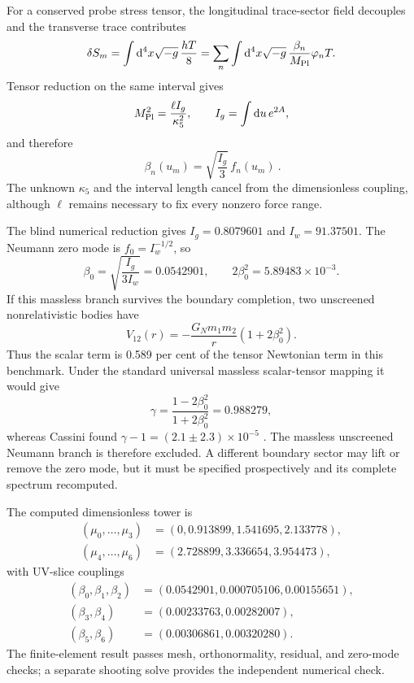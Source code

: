 \documentclass[10pt]{article}
\newcommand{\dd}{\mathrm{d}}
\begin{document}
For a conserved probe stress tensor, the longitudinal trace-sector field
decouples and the transverse trace contributes
\begin{equation}
 \delta S_m=\int\dd^4x\sqrt{-g}\,\frac{hT}{8}
 =\sum_n\int\dd^4x\sqrt{-g}\,
 \frac{\beta_n}{M_{\rm Pl}}\varphi_nT .
\end{equation}
Tensor reduction on the same interval gives
\begin{equation}
 M_{\rm Pl}^2=\frac{\ell I_g}{\kappa_5^2},\qquad
 I_g=\int\dd u\,e^{2A},
\end{equation}
and therefore
\begin{equation}
 \boxed{\ \beta_n(u_m)=\sqrt{\frac{I_g}{3}}\,f_n(u_m)\ }.
 \label{eq:betaderived}
\end{equation}
The unknown $\kappa_5$ and the interval length cancel from the dimensionless
coupling, although $\ell$ remains necessary to fix every nonzero force range.

The blind numerical reduction gives $I_g=0.8079601$ and $I_w=91.37501$.
The Neumann zero mode is $f_0=I_w^{-1/2}$, so
\begin{equation}
 \beta_0=\sqrt{\frac{I_g}{3I_w}}=0.0542901,
 \qquad 2\beta_0^2=5.89483\times10^{-3}.
 \label{eq:zeroforce}
\end{equation}
If this massless branch survives the boundary completion, two unscreened
nonrelativistic bodies have
\begin{equation}
 V_{12}(r)=-\frac{G_Nm_1m_2}{r}\left(1+2\beta_0^2\right).
\end{equation}
Thus the scalar term is 0.589 per cent of the tensor Newtonian term in this
benchmark.  Under the standard universal massless scalar-tensor mapping it
would give
\begin{equation}
 \gamma=\frac{1-2\beta_0^2}{1+2\beta_0^2}=0.988279,
\end{equation}
whereas Cassini found $\gamma-1=(2.1\pm2.3)\times10^{-5}$
\citep{Bertotti2003}.  The massless unscreened Neumann branch is therefore
excluded.  A different boundary sector may lift or remove the zero mode, but
it must be specified prospectively and its complete spectrum recomputed.

The computed dimensionless tower is
\begin{align}
 (\mu_0,\ldots,\mu_3)&=(0,0.913899,1.541695,2.133778),\\
 (\mu_4,\ldots,\mu_6)&=(2.728899,3.336654,3.954473),
\end{align}
with UV-slice couplings
\begin{align}
 (\beta_0,\beta_1,\beta_2)&=(0.0542901,0.000705106,0.00155651),\\
 (\beta_3,\beta_4)&=(0.00233763,0.00282007),\\
 (\beta_5,\beta_6)&=(0.00306861,0.00320280).
\end{align}
The finite-element result passes mesh, orthonormality, residual, and zero-mode
checks; a separate shooting solve provides the independent numerical check.
\end{document}
